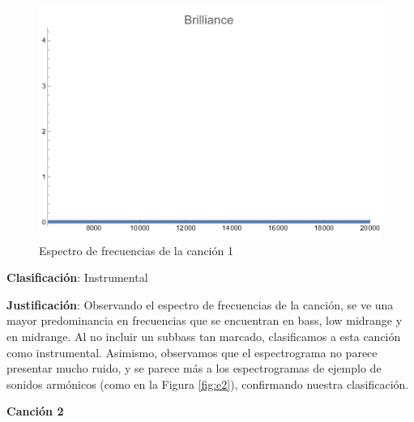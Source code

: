 \documentclass[12pt, letterpaper]{article}
\begin{document}
\begin{figure}[H]
\begin{minipage}{.3\textwidth}
  \end{minipage}
  \begin{minipage}{0.03\textwidth}\end{minipage}
  \begin{minipage}{.3\textwidth}
    \centering
    \includegraphics[width=.9\linewidth]{imgs/Cancion1/brilliance.png}
  \end{minipage}
  \caption{Espectro de frecuencias de la canción 1}
  \label{fig:esp01}
\end{figure}

\textbf{Clasificación}: Instrumental

\textbf{Justificación}: Observando el espectro de frecuencias de la canción,
se ve una mayor predominancia en frecuencias que se encuentran en bass, low
midrange y en midrange. Al no incluir un subbass tan marcado, clasificamos
a esta canción como instrumental. Asimismo, observamos que el espectrograma no
parece presentar mucho ruido, y se parece más a los espectrogramas de ejemplo
de sonidos armónicos (como en la Figura \ref{fig:e2}), confirmando nuestra
clasificación.

\newpage

\textbf{\large{Canción 2}}
\end{document}
